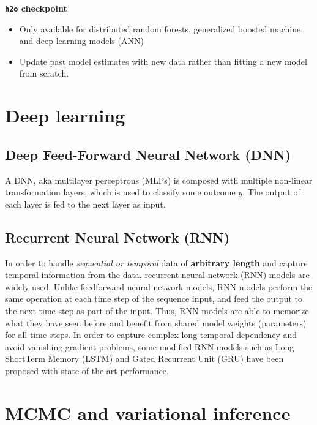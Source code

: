 \documentclass[fontset=fandol,zihao=false,scheme=chinese,heading=true,UTF8]{ctexbook}
\providecommand{\tightlist}{%
  \setlength{\itemsep}{0pt}\setlength{\parskip}{0pt}}
\begin{document}
\textbf{\texttt{h2o} checkpoint}

\begin{itemize}
\tightlist
\item
  Only available for distributed random forests, generalized boosted machine, and deep learning models (ANN)
\item
  Update past model estimates with new data rather than fitting a new model from scratch.
\end{itemize}

\hypertarget{deep-learning}{%
\chapter{Deep learning}\label{deep-learning}}

\hypertarget{deep-feed-forward-neural-network-dnn}{%
\section{Deep Feed-Forward Neural Network (DNN)}\label{deep-feed-forward-neural-network-dnn}}

A DNN, aka multilayer perceptrons (MLPs) is composed with multiple non-linear transformation layers, which is used to classify some outcome \(y\).
The output of each layer is fed to the next layer as input.

\hypertarget{recurrent-neural-network-rnn}{%
\section{Recurrent Neural Network (RNN)}\label{recurrent-neural-network-rnn}}

In order to handle \emph{sequential or temporal} data of \textbf{arbitrary length} and capture temporal information from the data, recurrent neural network (RNN) models are widely used.
Unlike feedforward neural network models, RNN models perform the same operation at each time step of the sequence input, and feed the output to the next time step as part of the input.
Thus, RNN models are able to memorize what they have seen before and benefit from shared model weights (parameters) for all time steps.
In order to capture complex long temporal dependency and avoid vanishing gradient problems, some modified RNN models such as Long ShortTerm Memory (LSTM) and Gated Recurrent Unit (GRU) have been proposed with state-of-the-art performance.

\hypertarget{mcmc-and-variational-inference}{%
\chapter{MCMC and variational inference}\label{mcmc-and-variational-inference}}
\end{document}
